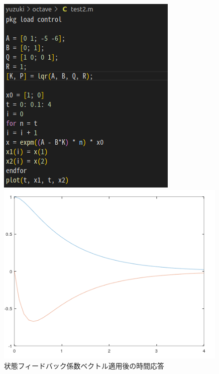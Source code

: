 \documentclass{jsarticle}
\begin{document}
\begin{figure}[htbp]
  \begin{minipage}[t]{0.5\linewidth}
    \centering
    \includegraphics[keepaspectratio, scale=0.485]{fig/ato_c.png}
  \end{minipage}
  \begin{minipage}[t]{0.5\linewidth}
    \centering
    \includegraphics[keepaspectratio, scale=0.48]{fig/ato_r.png}
  \end{minipage}\vspace*{2mm}
  \caption{状態フィードバック係数ベクトル適用後の時間応答}
\end{figure}
\end{document}
